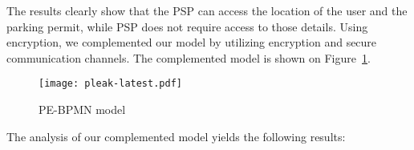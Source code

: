 The results clearly show that the PSP can access the location of the user and
the parking permit, while PSP does not require access to those details. Using
encryption, we complemented our model by utilizing encryption and secure
communication channels. The complemented model is shown on
Figure~\ref{fig:pleak-model}.

\begin{landscape}

\begin{figure}[ht]
\begin{center}
    \texttt{[image: pleak-latest.pdf]}
    \caption{PE-BPMN model}
    \label{fig:pleak-model}
\end{center}
\end{figure}

\end{landscape}

The analysis of our complemented model yields the following results:

